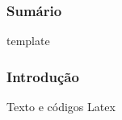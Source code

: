 \begin{frame}
  \titlepage
\end{frame}

\begin{frame}
  \frametitle{Sumário}
  \tableofcontents[pausesections]
\end{frame}

\begin{frame}template
  \frametitle{Introdução}
  Texto e códigos Latex
\end{frame}

